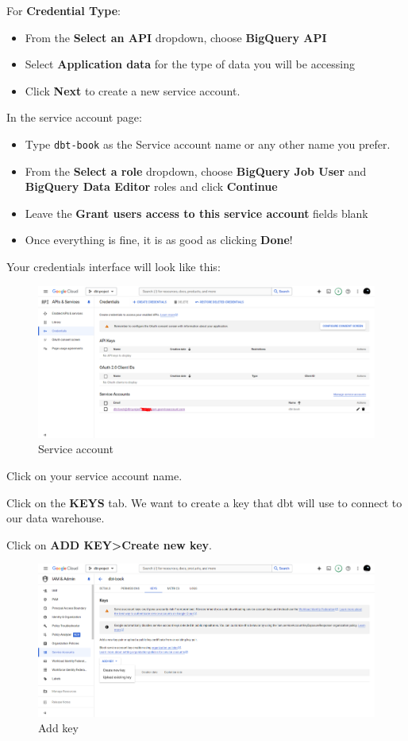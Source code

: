 \documentclass[
]{book}
\begin{document}
For \textbf{Credential Type}:

\begin{itemize}
\item
  From the \textbf{Select an API} dropdown, choose \textbf{BigQuery API}
\item
  Select \textbf{Application data} for the type of data you will be accessing
\item
  Click \textbf{Next} to create a new service account.
\end{itemize}

In the service account page:

\begin{itemize}
\item
  Type \texttt{dbt-book} as the Service account name or any other name you prefer.
\item
  From the \textbf{Select a role} dropdown, choose \textbf{BigQuery Job User} and \textbf{BigQuery Data Editor} roles and click \textbf{Continue}
\item
  Leave the \textbf{Grant users access to this service account} fields blank
\item
  Once everything is fine, it is as good as clicking \textbf{Done}!
\end{itemize}

Your credentials interface will look like this:

\begin{figure}
\centering
\includegraphics{./images/service-account.png}
\caption{Service account}
\end{figure}

Click on your service account name.

Click on the \textbf{KEYS} tab. We want to create a key that dbt will use to connect to our data warehouse.

Click on \textbf{ADD KEY\textgreater Create new key}.

\begin{figure}
\centering
\includegraphics{./images/add-key.png}
\caption{Add key}
\end{figure}
\end{document}
